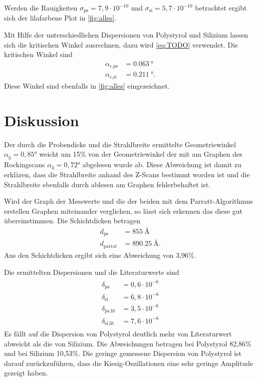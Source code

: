 Werden die Rauigkeiten $\sigma_\text{ps} = 7,9\cdot 10^{-10}$ und $\sigma_\text{si} = 5,7\cdot 10^{-10}$
betrachtet ergibt sich der lilafarbene Plot in \autoref{fig:alles}.

Mit Hilfe der unterschiedlichen Dispersionen von Polystyrol und Silizium lassen sich die kritischen Winkel ausrechnen,
dazu wird \autoref{eq:TODO} verwendet.
Die kritischen Winkel sind
\begin{align*}
    \alpha_\text{c,ps}& = \SI{0,063}{\degree}\\
    \alpha_\text{c,si}& = \SI{0.211}{\degree}.
\end{align*}
Diese Winkel sind ebenfalls in \autoref{fig:alles} eingezeichnet.

\section{Diskussion}
Der durch die Probendicke und die Strahlbreite ermittelte Geometriewinkel $\alpha_\text{g} =0,85°$ weicht um 15\%
von der Geometriewinkel der mit am Graphen des Rockingscans $\alpha_\text{g} =0,72°$ abgelesen wurde ab. 
Diese Abweichung ist damit zu erklären, dass die Strahlbreite anhand des Z-Scans bestimmt worden ist und die Strahlbreite
ebenfalls durch ablesen am Graphen fehlerbehaftet ist.

Wird der Graph der Messwerte und die der beiden mit dem Parratt-Algorithmus erstellen Graphen miteinander verglichen, so lässt sich 
erkennen das diese gut übereinstimmen.
Die Schichtdicken betragen
\begin{align*}
    d_\text{ps} &= \SI{855}{\angstrom}\\
    d_\text{parrat} &= \SI{890,25}{\angstrom}.
\end{align*}
Aus den Schichtdicken ergibt sich eine Abweichung von 3,96\%.

Die ermittelten Dispersionen und die Literaturwerte\cite{V44old} sind
\begin{align}
    \begin{split}    
        \delta_\text{ps} &= 0,6\cdot 10^{-6}\\
        \delta_\text{si}&= 6,8\cdot 10^{-6} \\
        \delta_\text{ps,lit} &= 3,5\cdot 10^{-6}\\
        \delta_\text{si,lit}&= 7,6\cdot 10^{-6}
    \end{split} 
\end{align}
Es fällt auf die Dispersion von Polystyrol deutlich mehr von Literaturwert abweicht als die von Silizium.
Die Abweichungen betragen bei Polystyrol 82,86\% und bei Silizium 10,53\%.
Die geringe gemessene Dispersion von Polystyrol ist darauf zurückzuführen, dass die Kiesig-Oszillationen eine
sehr geringe Amplitude gezeigt haben.

